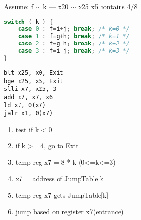 Assume: f $\sim$ k --- x20 $\sim$ x25 x5 contains 4/8
\begin{lstlisting}[language={c},title={C code}]
switch ( k ) {
    case 0 : f=i+j; break; /* k=0 */
    case 1 : f=g+h; break; /* k=1 */
    case 2 : f=g-h; break; /* k=2 */
    case 3 : f=i-j; break; /* k=3 */
}
\end{lstlisting}

\begin{lstlisting}[language={[x86masm]Assembler},title={RISC-V assembly code}]
blt x25, x0, Exit
bge x25, x5, Exit
slli x7, x25, 3
add x7, x7, x6 
ld x7, 0(x7)
jalr x1, 0(x7) 
\end{lstlisting}
\begin{enumerate}
    \item test if k < 0
    \item if k >= 4, go to Exit
    \item temp reg x7 = 8 * k (0<=k<=3)
    \item x7 = address of JumpTable[k]
    \item temp reg x7 gets JumpTable[k]
    \item jump based on register x7(entrance)
\end{enumerate}

